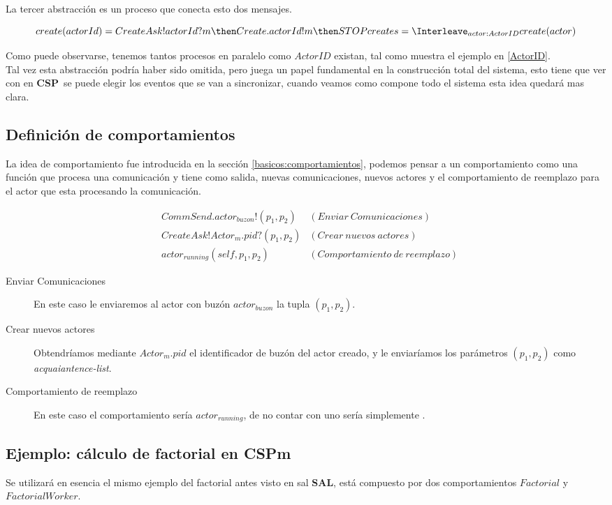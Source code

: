 \documentclass[fleqn]{article}
\newcommand{\SAL}{\textbf{SAL}}
\newcommand{\CSP}{\textbf{CSP}}
\begin{document}
La tercer abstracción es un proceso que conecta esto dos mensajes. 
 
\[
create(actorId) = CreateAsk!actorId?m \then Create.actorId!m \then STOP \\
creates = \Interleave_{actor : ActorID} create(actor)
\]

Como puede observarse, tenemos tantos procesos en paralelo como $ActorID$ existan, 
tal como muestra el ejemplo en \ref{ActorID}. \\
Tal vez esta abstracción podría haber sido omitida, pero juega un papel fundamental
en la construcción total del sistema, esto tiene que ver con en \CSP\ se puede elegir los 
eventos \cite[chap.~2,p.~55]{Roscoe:1997:TPC:550448} que se van a sincronizar, cuando 
veamos como compone todo el sistema esta idea quedará mas clara.


\subsection{Definición de comportamientos}
La idea de comportamiento fue introducida en la sección \ref{basicos:comportamientos}, 
podemos pensar a un comportamiento como una función que procesa una comunicación y tiene como salida,
nuevas comunicaciones, nuevos actores y el comportamiento de reemplazo para el
actor que esta procesando la comunicación.

\begin{align*}
&CommSend.actor_{buzon}!(p_1, p_2) & (Enviar\ Comunicaciones) \\ 
&CreateAsk!Actor_m.pid?(p_1, p_2) & (Crear\ nuevos\ actores)\\
&actor_{running}(self, p_1, p_2)  & (Comportamiento\ de\ reemplazo)
\end{align*}


\begin{description}
\item [Enviar Comunicaciones] En este caso le enviaremos al actor con buzón $actor_{buzon}$ la tupla $(p_1, p_2)$. 
\item [Crear nuevos actores] Obtendríamos mediante $Actor_m.pid$ el identificador de buzón del actor creado, y le enviaríamos los parámetros $(p_1, p_2)$ como \textit{acquaiantence-list}.
\item [Comportamiento de reemplazo] En este caso el comportamiento sería $actor_{running}$, de no contar con uno sería simplemente \Stop.
\end{description}


\subsection{Ejemplo: cálculo de factorial en CSPm}
Se utilizará en esencia el mismo ejemplo del factorial antes visto en sal \SAL,
está compuesto por dos comportamientos $Factorial$ y $FactorialWorker$.
\end{document}
